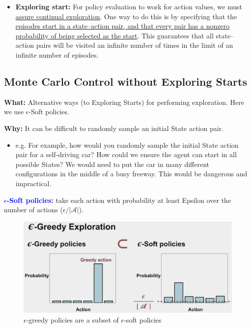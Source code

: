 \documentclass[12pt, a4paper]{article}
\begin{document}
\begin{itemize}
  \item \textbf{Exploring start:} For policy evaluation to work for action values, we must \uline{assure continual exploration}. One way to do this is by specifying that the \uline{episodes start in a state–action pair, and that every pair has a nonzero probability of being selected as the start}. This guarantees that all state–action pairs will be visited an infinite number of times in the limit of an infinite number of episodes.
\end{itemize}








\subsection{Monte Carlo Control without Exploring Starts}\label{monte-carlo-control-without-exploring-starts}

\textbf{What:} Alternative ways (to Exploring Starts) for performing exploration. Here we use $\epsilon$-Soft policies.

\textbf{Why:} It can be difficult to randomly sample an initial State action pair.

\begin{itemize}
  \item e.g. For example, how would you randomly sample the initial State action pair for a self-driving car? How could we ensure the agent can start in all possible States? We would need to put the car in many different configurations in the middle of a busy freeway. This would be dangerous and impractical.
\end{itemize}



\textbf{\textcolor{blue}{$\epsilon$-Soft policies}:} take each action with probability at least Epsilon over the number of actions ($\epsilon/|\mathcal{A}|$).

\begin{figure}[H]
  \centering  %
    \includegraphics[width=1.0\columnwidth]{images/epsilon-soft-policies.png}
    \caption{$\epsilon$-greedy policies are a subset of $\epsilon$-soft policies}
    \label{fig:monte-carlo-policy-iteration}
\end{figure}
\end{document}

